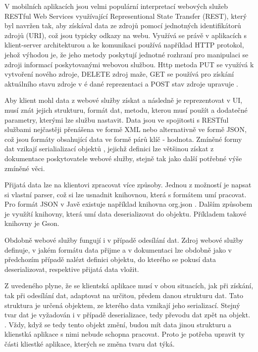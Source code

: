 V mobilních aplikacích jsou velmi populární interpretací webových služeb RESTful Web Services využívající Representional State Transfer (REST), který byl navržen tak, aby získával data ze zdrojů pomocí jednotných identifikátorů zdrojů (URI), což jsou typicky odkazy na webu. Využívá se právě v aplikacích s klient-server architekturou a ke komunikaci používá například HTTP protokol, jehož výhodou je, že jeho metody poskytují jednotné rozhraní pro manipulaci se zdroji informací poskytovanými webovou službou. Http metoda PUT se využívá k vytvoření nového zdroje, DELETE zdroj maže, GET se používá pro získání aktuálního stavu zdroje v 
é dané reprezentaci a POST stav zdroje upravuje \cite{oracle-ws}. 

Aby klient mohl data z webové služby získat a následně je reprezentovat v UI, musí znát jejich strukturu, formát dat, metodu, kterou musí použít a dodatečné parametry, kterými lze službu nastavit. Data jsou ve spojitosti s RESTful službami nejčastěji přenášena ve formě XML nebo alternativně ve formě JSON\cite{ws-formats}, což jsou formáty obsahující data ve formě párů klíč - hodnota. Zmíněné formy dat vzikají serialializací objektů \cite{serialization}, jejichž definici lze většinou získat z dokumentace poskytovatele webové služby, stejně tak jako další potřebné výše zmíněné věci.

Přijatá data lze na klientovi zpracovat více způsoby. Jednou z možností je napsat si vlastní parser, což si lze usnadnit knihovnou, která s formátem umí pracovat. Pro formát JSON v Javě existuje například knihovna org.json \cite{json}. Dalším způsobem je využítí knihovny, která umí data deserializovat do objektu. Příkladem takové knihovny je Gson\cite{gson}. 

Obdobně webové služby fungují i v případě odesílání dat. Zdroj webové služby definuje, v jakém formátu data přijme a v dokumentaci lze obdobně jako v předchozím případě nalézt definici objektu, do kterého se pokusí data deserializovat, respektive přijatá data vložit. 

Z uvedeného plyne, že se klientská aplikace musí v obou situacích, jak při získání, tak při odesílání dat, adaptovat na určitou, předem danou strukturu dat. Tato struktura je určená objektem, ze kterého data vznikají jeho serializací. Stejný tvar dat je vyžadován i v případě deserializace, tedy převodu dat zpět na objekt. \cite{serialization}. Vždy, když se tedy tento objekt změní, budou mít data jinou strukturu a klienstká aplikace s nimi nebude schopna pracovat. Proto je potřeba upravit ty části kliestké aplikace, kterých se změna tvaru dat týká.

